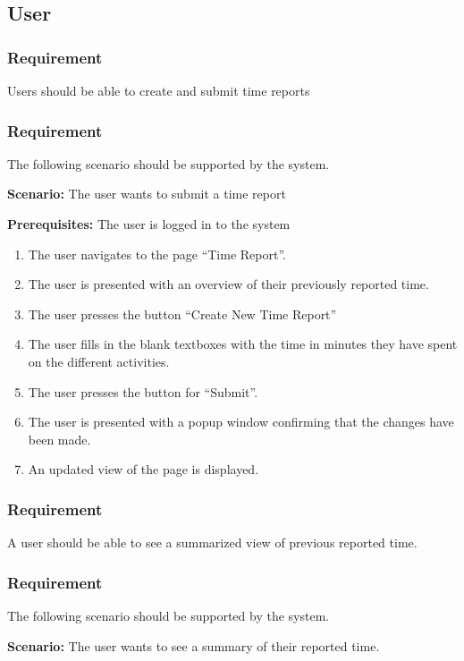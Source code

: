\documentclass{article}
\begin{document}
\subsection{User}
\subsubsection{Requirement}
Users should be able to create and submit time reports

\subsubsection{Requirement}
The following scenario should be supported by the system.

\textbf{Scenario:} The user wants to submit a time report

\textbf{Prerequisites:} The user is logged in to the system

\begin{enumerate}


\item The user navigates to the page “Time Report”. 
\item The user is presented with an overview of their previously reported time. 
\item The user presses the button “Create New Time Report”
\item The user fills in the blank textboxes with the time in minutes they have spent on the different activities.
\item The user presses the button for “Submit”.
\item The user is presented with a popup window confirming that the changes have been made.
\item An updated view of the page is displayed.
\end{enumerate}

\subsubsection{Requirement}
A user should be able to see a summarized view of previous reported time.

\subsubsection{Requirement}
The following scenario should be supported by the system.

\textbf{Scenario:} The user wants to see a summary of their reported time.
\end{document}
